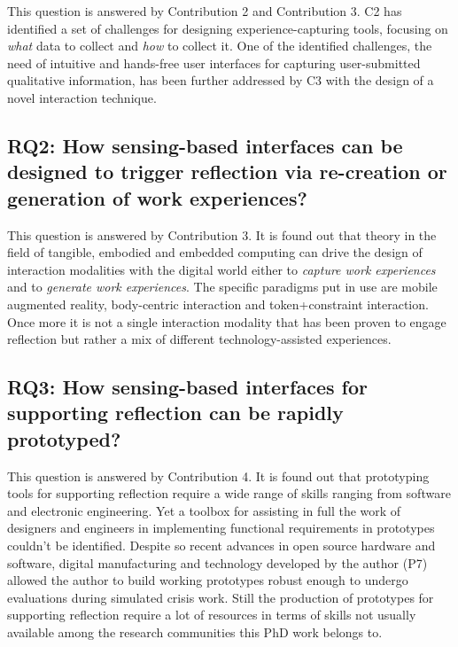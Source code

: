 This question is answered by Contribution 2 and Contribution 3. C2 has identified a set of challenges for designing experience-capturing tools, focusing on \emph{what} data to collect and \emph{how} to collect it. One of the identified challenges, the need of intuitive and hands-free user interfaces for capturing user-submitted qualitative information, has been further addressed by C3 with the design of a novel interaction technique.

\subsection{RQ2: How sensing-based interfaces can be designed to trigger reflection via re-creation or generation of work experiences?}\label{rq2-how-sensing-based-interfaces-can-be-designed-to-trigger-reflection-via-re-creation-or-generation-of-work-experiences}

This question is answered by Contribution 3. It is found out that theory in the field of tangible, embodied and embedded computing can drive the design of interaction modalities with the digital world either to \emph{capture work experiences} and to \emph{generate work experiences}. The specific paradigms put in use are mobile augmented reality, body-centric interaction and token+constraint interaction. Once more it is not a single interaction modality that has been proven to engage reflection but rather a mix of different technology-assisted experiences.

\subsection{RQ3: How sensing-based interfaces for supporting reflection can be rapidly prototyped?}\label{rq3-how-sensing-based-interfaces-for-supporting-reflection-can-be-rapidly-prototyped}

This question is answered by Contribution 4. It is found out that prototyping tools for supporting reflection require a wide range of skills ranging from software and electronic engineering. Yet a toolbox for assisting in full the work of designers and engineers in implementing functional requirements in prototypes couldn't be identified. Despite so recent advances in open source hardware and software, digital manufacturing and technology developed by the author (P7) allowed the author to build working prototypes robust enough to undergo evaluations during simulated crisis work. Still the production of prototypes for supporting reflection require a lot of resources in terms of skills not usually available among the research communities this PhD work belongs to.

